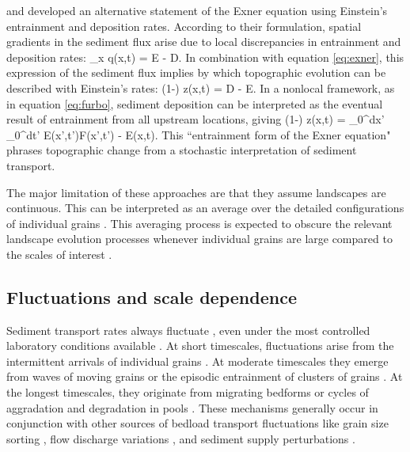 \citet{Nakagawa1976} and \citet{Tsujimoto1978} developed an alternative statement of the Exner equation using Einstein's entrainment and deposition rates.
According to their formulation, spatial gradients in the sediment flux arise due to local discrepancies in entrainment and deposition rates:
\be \partial_x q(x,t) = E - D. \ee 
In combination with equation \ref{eq:exner}, this expression of the sediment flux implies \citep{Parker2000,Furbish2012,Fathel2015,Furbish2017} by which topographic evolution can be described with Einstein's rates: 
\be (1-\phi) \px z(x,t) = D - E.\ee
In a nonlocal framework, as in equation \ref{eq:furbo}, sediment deposition can be interpreted as the eventual result of entrainment from all upstream locations, giving
\be (1-\phi) \px z(x,t) = \int_0^\infty dx' \int_0^\infty dt' E(x',t')F(x',t') - E(x,t). \ee
This ``entrainment form of the Exner equation" \citep{Furbish2017} phrases topographic change from a stochastic interpretation of sediment transport.

The major limitation of these approaches are that they assume landscapes are continuous. This can be interpreted as an average over the detailed configurations of individual grains \citep{Coleman2009}. This averaging process is expected to obscure the relevant landscape evolution processes whenever individual grains are large compared to the scales of interest \citep[e.g.][]{Shobe2021}.

\subsection{Fluctuations and scale dependence}

Sediment transport rates always fluctuate \citep{Kuhnle1988,Hoey1992,Recking2012}, even under the most controlled laboratory conditions available \citep{Ancey2006,Roseberry2012}.
At short timescales, fluctuations arise from the intermittent arrivals of individual grains \citep{Bohm2004,Ballio2018}. At moderate timescales they emerge from waves of moving grains \citep{Heyman2014} or the episodic entrainment of clusters of grains \citep{Strom2004,Papanicolaou2018}. At the longest timescales, they originate from migrating bedforms \citep{Guala2014} or cycles of aggradation and degradation in pools \citep{Dhont2018}.
These mechanisms generally occur in conjunction with other sources of bedload transport fluctuations like grain size sorting \citep{Iseya1987,Cudden2003}, flow discharge variations \citep{Wong2006,Mao2012,Redolfi2018}, and sediment supply perturbations \citep{Lisle1993,Madej2009,Elgueta-Astaburuaga2019}.


